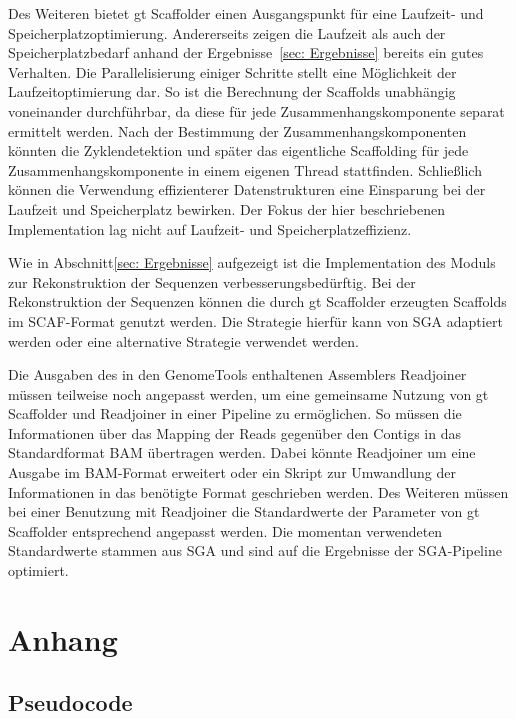 \documentclass[a4paper,11pt,parskip]{scrartcl}
\begin{document}
Des Weiteren bietet gt Scaffolder einen Ausgangspunkt für eine Laufzeit-
und Speicherplatzoptimierung. Andererseits zeigen die Laufzeit als auch der
Speicherplatzbedarf anhand der Ergebnisse~\ref{sec: Ergebnisse}
bereits ein gutes Verhalten. Die Parallelisierung einiger Schritte
stellt eine Möglichkeit der Laufzeitoptimierung dar. So ist die
Berechnung der Scaffolds unabhängig voneinander durchführbar, da diese
für jede Zusammenhangskomponente separat ermittelt werden. Nach der
Bestimmung der Zusammenhangskomponenten könnten die Zyklendetektion
und später das eigentliche Scaffolding für jede Zusammenhangskomponente
in einem eigenen Thread stattfinden. Schließlich können die Verwendung
effizienterer Datenstrukturen eine Einsparung bei der Laufzeit und
Speicherplatz bewirken. Der Fokus der hier beschriebenen Implementation
lag nicht auf Laufzeit- und Speicherplatzeffizienz.

Wie in Abschnitt\ref{sec: Ergebnisse} aufgezeigt ist die
Implementation des Moduls zur Rekonstruktion der Sequenzen
verbesserungsbedürftig. Bei der Rekonstruktion der Sequenzen können
die durch gt Scaffolder erzeugten Scaffolds im SCAF-Format genutzt
werden. Die Strategie hierfür kann von SGA adaptiert werden oder eine
alternative Strategie verwendet werden.

Die Ausgaben des in den GenomeTools enthaltenen Assemblers Readjoiner
müssen teilweise noch angepasst werden, um eine gemeinsame Nutzung von gt
Scaffolder und Readjoiner in einer Pipeline zu ermöglichen. So müssen die
Informationen über das Mapping der Reads gegenüber den Contigs in das
Standardformat BAM übertragen werden. Dabei könnte Readjoiner um
eine Ausgabe im BAM-Format erweitert oder ein Skript zur Umwandlung der
Informationen in das benötigte Format geschrieben werden. Des Weiteren
müssen bei einer Benutzung mit Readjoiner die Standardwerte der
Parameter von gt Scaffolder entsprechend angepasst werden. Die momentan
verwendeten Standardwerte stammen aus SGA und sind auf die Ergebnisse
der SGA-Pipeline optimiert.

\section*{Anhang}
\subsection*{Pseudocode}
\end{document}
